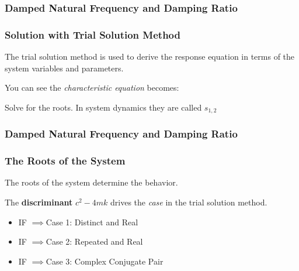\documentclass[fleqn]{beamer} %
\newcommand{\sectionIIsubsectionItitle}{Damped Natural Frequency and Damping Ratio}
\begin{document}
			\begin{frame}[label=sectionIIsubsectionI]
				\frametitle{\sectionIIsubsectionItitle}
				\bigskip


				\frametitle{Solution with Trial Solution Method}

				The trial solution method is used to derive the response equation in terms of the system variables and parameters. \vspc


					 \vspc

				\large You can see the {\it characteristic equation} becomes: \vspc
					   \vspc

				\large Solve for the roots. In system dynamics they are called $s_{1,2}$  \vspc

					   \vspc

			
				\btVFill
			\end{frame}


			\begin{frame}[label=sectionIIsubsectionI]
				\frametitle{\sectionIIsubsectionItitle}
				\bigskip

				\frametitle{The Roots of the System}

				\large The roots of the system determine the behavior.  \vspc

				\vspc

				The {\bf discriminant} $c^2-4mk$ drives the {\it case} in the trial solution method. \vspc

				\begin{itemize}
				\item IF \underline{\hspace{20mm}} $\implies$Case 1: Distinct and Real \vspace{1mm}\\
				\item IF \underline{\hspace{20mm}} $\implies$Case 2: Repeated and Real \vspace{1mm}\\
				\item IF \underline{\hspace{20mm}} $\implies$Case 3: Complex Conjugate Pair \vspc
				\end{itemize}

			
				\btVFill
			\end{frame}
\end{document}
